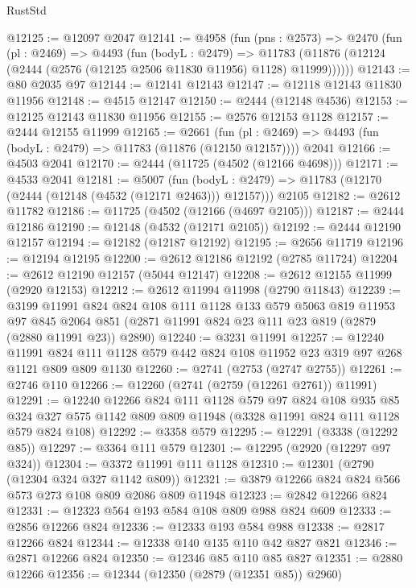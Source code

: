 \begin{lexlean}{RustStd}
\begin{coremodule}
@12125 := @12097 @2047
@12141 := @4958
    (fun (pns : @2573) =>
    @2470
      (fun (pl : @2469) =>
      @4493
        (fun (bodyL : @2479) =>
        @11783 (@11876 (@12124 (@2444 (@2576 (@12125 @2506 @11830 @11956) @1128) @11999))))))
@12143 := @80 @2035 @97
@12144 := @12141 @12143
@12147 := @12118 @12143 @11830 @11956
@12148 := @4515 @12147
@12150 := @2444 (@12148 @4536)
@12153 := @12125 @12143 @11830 @11956
@12155 := @2576 @12153 @1128
@12157 := @2444 @12155 @11999
@12165 := @2661
    (fun (pl : @2469) => @4493 (fun (bodyL : @2479) => @11783 (@11876 (@12150 @12157))))
    @2041
@12166 := @4503 @2041
@12170 := @2444 (@11725 (@4502 (@12166 @4698)))
@12171 := @4533 @2041
@12181 := @5007
    (fun (bodyL : @2479) => @11783 (@12170 (@2444 (@12148 (@4532 (@12171 @2463))) @12157)))
    @2105
@12182 := @2612 @11782
@12186 := @11725 (@4502 (@12166 (@4697 @2105)))
@12187 := @2444 @12186
@12190 := @12148 (@4532 (@12171 @2105))
@12192 := @2444 @12190 @12157
@12194 := @12182 (@12187 @12192)
@12195 := @2656 @11719
@12196 := @12194 @12195
@12200 := @2612 @12186 @12192 (@2785 @11724)
@12204 := @2612 @12190 @12157 (@5044 @12147)
@12208 := @2612 @12155 @11999 (@2920 @12153)
@12212 := @2612 @11994 @11998 (@2790 @11843)
@12239 := @3199
    @11991
    @824
    @824
    @108
    @111
    @1128
    @133
    @579
    @5063
    @819
    @11953
    @97
    @845
    @2064
    @851
    (@2871 @11991 @824 @23 @111 @23 @819 (@2879 (@2880 @11991 @23)) @2890)
@12240 := @3231 @11991
@12257 := @12240
    @11991
    @824
    @111
    @1128
    @579
    @442
    @824
    @108
    @11952
    @23
    @319
    @97
    @268
    @1121
    @809
    @809
    @1130
@12260 := @2741 (@2753 (@2747 @2755))
@12261 := @2746 @110
@12266 := @12260 (@2741 (@2759 (@12261 @2761)) @11991)
@12291 := @12240
    @12266
    @824
    @111
    @1128
    @579
    @97
    @824
    @108
    @935
    @85
    @324
    @327
    @575
    @1142
    @809
    @809
    @11948
    (@3328 @11991 @824 @111 @1128 @579 @824 @108)
@12292 := @3358 @579
@12295 := @12291 (@3338 (@12292 @85))
@12297 := @3364 @111 @579
@12301 := @12295 (@2920 (@12297 @97 @324))
@12304 := @3372 @11991 @111 @1128
@12310 := @12301 (@2790 (@12304 @324 @327 @1142 @809))
@12321 := @3879 @12266 @824 @824 @566 @573 @273 @108 @809 @2086 @809 @11948
@12323 := @2842 @12266 @824
@12331 := @12323 @564 @193 @584 @108 @809 @988 @824 @609
@12333 := @2856 @12266 @824
@12336 := @12333 @193 @584 @988
@12338 := @2817 @12266 @824
@12344 := @12338 @140 @135 @110 @42 @827 @821
@12346 := @2871 @12266 @824
@12350 := @12346 @85 @110 @85 @827
@12351 := @2880 @12266
@12356 := @12344 (@12350 (@2879 (@12351 @85)) @2960)

\end{coremodule}
\end{lexlean}
